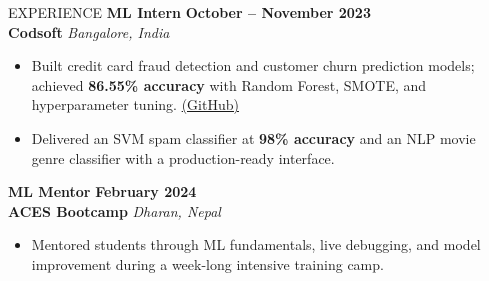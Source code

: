 \documentclass{resume}
\begin{document}
\begin{rSection}{EXPERIENCE}
\textbf{ML Intern} \hfill \textbf{October – November 2023} \\
\textbf{Codsoft} \hfill \textit{Bangalore, India}
\begin{itemize} \itemsep -3pt {}
    \item Built credit card fraud detection and customer churn prediction models; achieved \textbf{86.55\% accuracy} with Random Forest, SMOTE, and hyperparameter tuning. \href{https://github.com/abhiverse01/CODSOFT-INTERN}{(GitHub)}
    \item Delivered an SVM spam classifier at \textbf{98\% accuracy} and an NLP movie genre classifier with a production-ready interface.
\end{itemize}

\textbf{ML Mentor} \hfill \textbf{February 2024} \\
\textbf{ACES Bootcamp} \hfill \textit{Dharan, Nepal}
\begin{itemize} \itemsep -3pt {}
    \item Mentored students through ML fundamentals, live debugging, and model improvement during a week-long intensive training camp.
\end{itemize}

\end{rSection}
\end{document}
